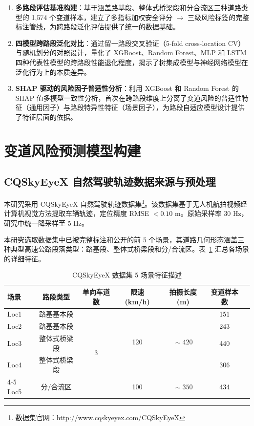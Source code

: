 \documentclass[preprint,review,12pt,a4paper]{elsarticle}
\begin{document}
\begin{enumerate}
  \item \textbf{多路段评估基准构建}：基于涵盖路基段、整体式桥梁段和分合流区三种道路类型的 1,574 个变道样本，建立了多指标加权安全评分 $\to$ 三级风险标签的完整标注管线，为跨路段泛化评估提供了统一的数据基础。
  \item \textbf{四模型跨路段泛化对比}：通过留一路段交叉验证（5-fold cross-location CV）与随机划分的对照设计，量化了 XGBoost、Random Forest、MLP 和 LSTM 四种代表性模型的跨路段性能退化程度，揭示了树集成模型与神经网络模型在泛化行为上的本质差异。
  \item \textbf{SHAP 驱动的风险因子普适性分析}：利用 XGBoost 和 Random Forest 的 SHAP 值多模型一致性分析，首次在跨路段维度上分离了变道风险的普适性特征（通用因子）与路段特异性特征（场景因子），为路段自适应模型设计提供了特征层面的依据。
\end{enumerate}

\section{变道风险预测模型构建}

\subsection{CQSkyEyeX 自然驾驶轨迹数据来源与预处理}

本研究采用 CQSkyEyeX 自然驾驶轨迹数据集\cite{C17}\footnote{数据集官网：http://www.cqskyeyex.com/CQSkyEyeX}。该数据集基于无人机航拍视频经计算机视觉方法提取车辆轨迹\cite{C24}，定位精度 RMSE $<0.10$ m。原始采样率 30 Hz，研究中统一降采样至 5 Hz。

本研究选取数据集中已被完整标注和公开的前 5 个场景，其道路几何形态涵盖三种典型高速公路段落类型：路基段、整体式桥梁段和分/合流区。表~\ref{tab:scenes} 汇总各场景的详细特征。

\begin{table}[H]
\centering
\caption{CQSkyEyeX 数据集 5 场景特征描述}
\label{tab:scenes}
\small
\begin{tabular}{lcccccc}
\toprule
场景 &  路段类型 & 单向车道数 & 限速 (km/h) & 拍摄长度 (m) & 变道样本数 \\
\midrule
Loc1 & 路基基本段 & \multirow{5}{*}{3} & \multirow{4}{*}{120} & \multirow{4}{*}{$\!\sim\!420$} & 151 \\
Loc2 & 路基基本段 &                    &                      &                               & 243 \\
Loc3 & 整体式桥梁段 &                  &                      &                               & 440 \\
Loc4 & 整体式桥梁段 &                  &                      &                               & 306 \\
\cmidrule(lr){4-5}
Loc5 & 分/合流区 &                    & 100                  & $\!\sim\!350$                 & 434 \\
\bottomrule
\end{tabular}
\end{table}
\end{document}
